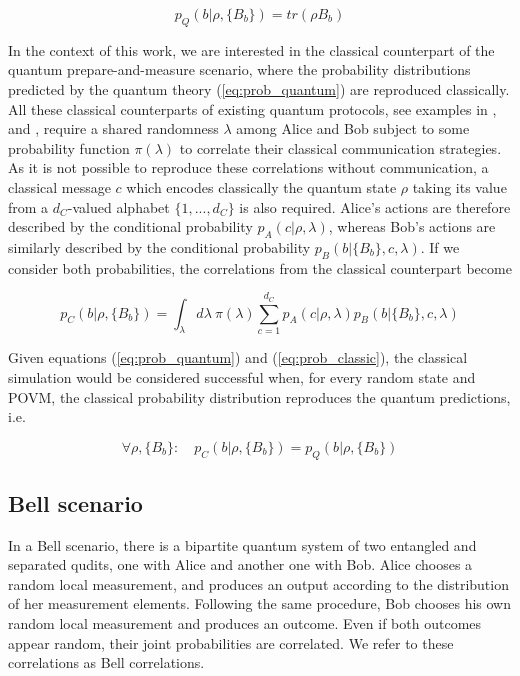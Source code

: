 \begin{equation}\label{eq:prob_quantum}
p_Q(b|\rho,\{B_b\}) = tr(\rho B_b)
\end{equation}

In the context of this work, we are interested in the classical counterpart of the quantum prepare-and-measure scenario, where the probability distributions predicted by the quantum theory (\ref{eq:prob_quantum}) are reproduced classically. All these classical counterparts of existing quantum protocols, see examples in \cite{cerf2000}, \cite{toner2003} and \cite{renner2022}, require a shared randomness $\lambda$ among Alice and Bob subject to some probability function $\pi(\lambda)$ to correlate their classical communication strategies. As it is not possible to reproduce these correlations without communication, a classical message $c$ which encodes classically the quantum state $\rho$ taking its value from a $d_C$-valued alphabet $\{1,...,d_C\}$ is also required. Alice's actions are therefore described by the conditional probability $p_A(c|\rho,\lambda)$, whereas Bob's actions are similarly described by the conditional probability $p_B(b|\{B_b\},c,\lambda)$. If we consider both probabilities, the correlations from the classical counterpart become

\begin{equation}\label{eq:prob_classic}
p_C(b|\rho,\{B_b\}) = \int_{\lambda} d\lambda\ \pi(\lambda) \sum_{c=1}^{d_C} p_A(c|\rho, \lambda) p_B(b|\{B_b\}, c, \lambda)
\end{equation}

Given equations (\ref{eq:prob_quantum}) and (\ref{eq:prob_classic}), the classical simulation would be considered successful when, for every random state and POVM, the classical probability distribution reproduces the quantum predictions, i.e.

\begin{equation}
\forall \rho, \{B_b\}:\quad p_C(b|\rho,\{B_b\}) = p_Q(b|\rho,\{B_b\})
\end{equation}

\subsection{Bell scenario}
In a Bell scenario, there is a bipartite quantum system of two entangled and separated qudits, one with Alice and another one with Bob. 
Alice chooses a random local measurement, and produces an output according to the distribution of her measurement elements. Following the same procedure, Bob chooses his own random local measurement and produces an outcome. Even if both outcomes appear random, their joint probabilities are correlated. We refer to these correlations as Bell correlations.

